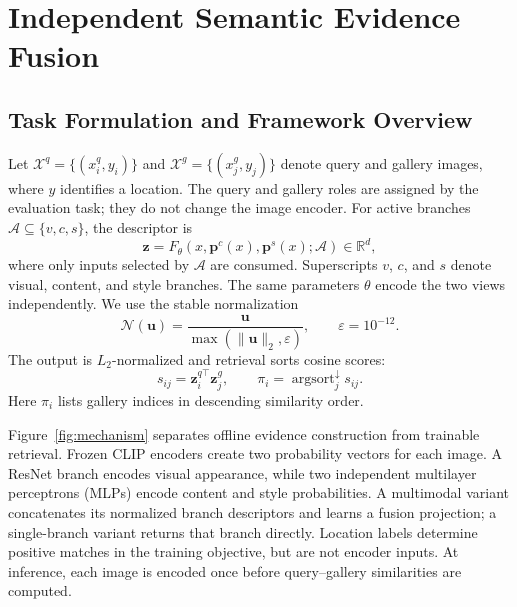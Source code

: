 \documentclass[journal]{IEEEtran}
\newcommand{\vect}[1]{\boldsymbol{#1}}
\begin{document}
\section{Independent Semantic Evidence Fusion}
\label{sec:method}

\subsection{Task Formulation and Framework Overview}

Let $\mathcal{X}^{q}=\{(x_i^{q},y_i)\}$ and
$\mathcal{X}^{g}=\{(x_j^{g},y_j)\}$ denote query and gallery images, where
$y$ identifies a location. The query and gallery roles are assigned by the
evaluation task; they do not change the image encoder. For active branches
$\mathcal{A}\subseteq\{v,c,s\}$, the descriptor is
\begin{equation}
  \vect{z}=F_\theta(x,\vect{p}^{c}(x),\vect{p}^{s}(x);\mathcal{A})
  \in\mathbb{R}^{d},
  \label{eq:strict-gate}
\end{equation}
where only inputs selected by $\mathcal{A}$ are consumed. Superscripts $v$,
$c$, and $s$ denote visual, content, and style branches. The same parameters
$\theta$ encode the two views independently. We use the stable normalization
\begin{equation}
  \mathcal{N}(\vect{u})=
  \frac{\vect{u}}{\max(\|\vect{u}\|_2,\varepsilon)},
  \qquad \varepsilon=10^{-12}.
  \label{eq:stable-normalization}
\end{equation}
The output is $L_2$-normalized and retrieval sorts cosine scores:
\begin{equation}
  s_{ij}=\vect{z}_i^{q\top}\vect{z}_j^{g},\qquad
  \pi_i=\operatorname{argsort}_{j}^{\downarrow}s_{ij}.
  \label{eq:retrieval-ranking}
\end{equation}
Here $\pi_i$ lists gallery indices in descending similarity order.

Figure~\ref{fig:mechanism} separates offline evidence construction from
trainable retrieval. Frozen CLIP encoders create two probability vectors for
each image. A ResNet branch encodes visual appearance, while two independent
multilayer perceptrons (MLPs) encode content and style probabilities. A
multimodal variant concatenates its normalized branch descriptors and learns
a fusion projection; a single-branch variant returns that branch directly.
Location labels determine positive matches in the training objective, but
are not encoder inputs. At inference, each image is encoded once before
query--gallery similarities are computed.
\end{document}
